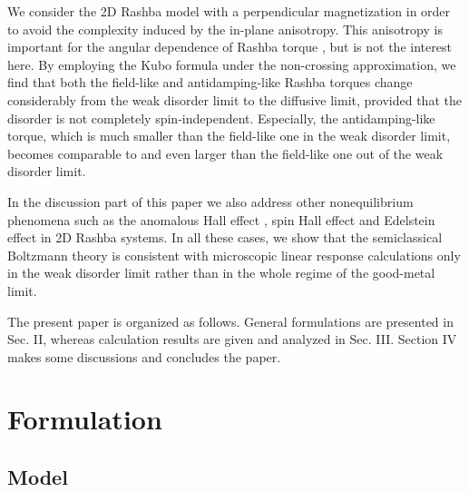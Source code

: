 \documentclass
[aps,pra,amsfonts,amssymb,twocolumn,amsmath,preprintnumbers,nofootinbib,floatfix,
showpacs,superscriptaddress]{revtex4-1}%
\begin{document}
We consider the 2D Rashba model with a perpendicular magnetization
\cite{Titov2015} in order to avoid the complexity induced by the in-plane
anisotropy. This anisotropy is important for the angular dependence of Rashba
torque \cite{Lee2015}, but is not the interest here. By employing the Kubo
formula under the non-crossing approximation, we find that both the field-like
and antidamping-like Rashba torques change considerably from the weak disorder
limit to the diffusive limit, provided that the disorder is not completely
spin-independent. Especially, the antidamping-like torque, which is much
smaller than the field-like one in the weak disorder limit, becomes comparable to
and even larger than the field-like one out of the weak disorder limit.

In the discussion part of this paper we also address other nonequilibrium
phenomena such as the anomalous Hall effect \cite{Nunner2007}, spin Hall
effect \cite{Sinova2015} and Edelstein effect \cite{Edelstein1990} in 2D
Rashba systems. In all these cases, we show that the semiclassical Boltzmann
theory is consistent with microscopic linear response calculations only in the
weak disorder limit rather than in the whole regime of the good-metal limit.

The present paper is organized as follows. General formulations are presented
in Sec. II, whereas calculation results are given and analyzed in Sec. III.
Section IV makes some discussions and concludes the paper.

\section{Formulation}

\subsection{Model}
\end{document}
